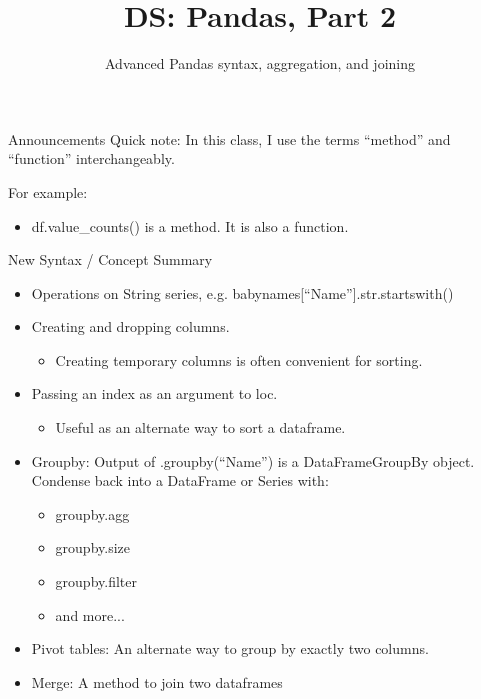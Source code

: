 \documentclass[aspectratio=169]{../latex_main/tntbeamer}  %
\title[Introduction]{DS: Pandas, Part 2}
\subtitle{Advanced Pandas syntax, aggregation, and joining}
\begin{document}
	
	\maketitle
	
	\begin{frame}[c]{Announcements}
	    Quick note: In this class, I use the terms “method” and “function” interchangeably. 
	    
	    For example:
	    \begin{itemize}
	        \item df.value\_counts() is a method. It is also a function.

	    \end{itemize}

	\end{frame}
	
	\begin{frame}[c]{New Syntax / Concept Summary}
	    \begin{itemize}
	        \item Operations on String series, e.g. babynames[“Name”].str.startswith()
	        \item Creating and dropping columns.
	        \begin{itemize}
	            \item Creating temporary columns is often convenient for sorting.
	        \end{itemize}
	        \item Passing an index as an argument to loc.
	        \begin{itemize}
	            \item Useful as an alternate way to sort a dataframe.
	        \end{itemize}
            \item Groupby: Output of .groupby(“Name”) is a DataFrameGroupBy object. Condense back into a DataFrame or Series with:
            \begin{itemize}
                \item groupby.agg
                \item groupby.size
                \item groupby.filter
                \item and more...
            \end{itemize}
            \item Pivot tables: An alternate way to group by exactly two columns.
            \item Merge: A method to join two dataframes
	    \end{itemize}

	\end{frame}
	
\end{document}
